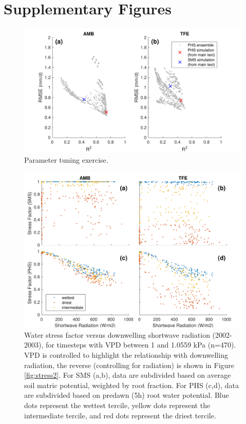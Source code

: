 \documentclass[draft,linenumbers]{agujournal}
\begin{document}
\clearpage

\appendix

\section{Supplementary Figures}


      \begin{figure}[h]
     \centering
     \includegraphics[width=30pc]{../figs3/ens.pdf}
     \caption{Parameter tuning exercise.
     }
     \label{supp:ens}
       \end{figure}
         \clearpage

      \begin{figure}[h]
     \centering
     \includegraphics[width=30pc]{../figs3/suppstress.pdf}
     \caption{Water stress factor versus downwelling shortwave radiation (2002-2003), for timesteps with VPD between 1 and 1.0559 kPa (n=470).
     VPD is controlled to highlight the relationship with downwelling radiation, the reverse (controlling for radiation) is shown in Figure \ref{fig:stress2}.
     For SMS (a,b), data are subdivided based on average soil matric potential, weighted by root fraction.
     For PHS (c,d), data are subdivided based on predawn (5h) root water potential.
     Blue dots represent the wettest tercile, yellow dots represent the intermediate tercile, and red dots represent the driest tercile.
     }
     \label{supp:fsds}
       \end{figure}
         \clearpage
\end{document}
